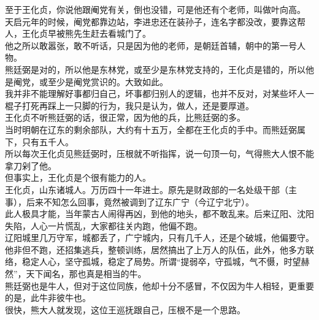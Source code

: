 \begin{multicols}{\theparacolNo}
至于王化贞，你说他跟阉党有关，倒也没错，可是他还有个老师，叫做叶向高。\\

天启元年的时候，阉党都靠边站，李进忠还在装孙子，连名字都没改，要靠这帮人，王化贞早被熊先生赶去看城门了。\\

他之所以敢嚣张，敢不听话，只是因为他的老师，是朝廷首辅，朝中的第一号人物。\\

熊廷弼是对的，所以他是东林党，或至少是东林党支持的，王化贞是错的，所以他是阉党，或至少是阉党赏识的。大致如此。\\

我并非不能理解好事都归自己，坏事都归别人的逻辑，也并不反对，对某些坏人一棍子打死再踩上一只脚的行为，我只是认为，做人，还是要厚道。\\

王化贞不听熊廷弼的话，很正常，因为他的兵，比熊廷弼的多。\\

当时明朝在辽东的剩余部队，大约有十五万，全都在王化贞的手中。而熊廷弼属下，只有五千人。\\

所以每次王化贞见熊廷弼时，压根就不听指挥，说一句顶一句，气得熊大人恨不能拿刀剁了他。\\

但事实上，王化贞是个很有能力的人。\\

王化贞，山东诸城人。万历四十一年进士。原先是财政部的一名处级干部（主事），后来不知怎么回事，竟然被调到了辽东广宁（今辽宁北宁）。\\

此人极具才能，当年蒙古人闹得再凶，到他的地头，都不敢乱来。后来辽阳、沈阳失陷，人心一片慌乱，大家都往关内跑，他偏不跑。\\

辽阳城里几万守军，城都丢了，广宁城内，只有几千人，还是个破城，他偏要守。\\

他非但不跑，还招集逃兵，整顿训练，居然搞出了上万人的队伍，此外，他多方联络，稳定人心，坚守孤城，稳定了局势。所谓“提弱卒，守孤城，气不慑，时望赫然”，天下闻名，那也真是相当的牛。\\

熊廷弼也是牛人，但对于这位同族，他却十分不感冒，不仅因为牛人相轻，更重要的是，此牛非彼牛也。\\

很快，熊大人就发现，这位王巡抚跟自己，压根不是一个思路。\\


\end{multicols}
